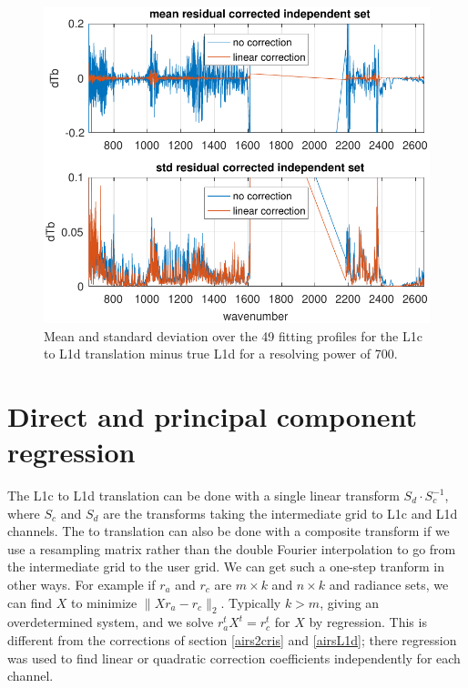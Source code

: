 \documentclass[10pt,twocolumn]{article}
\begin{document}
\begin{figure} %
  \centering
  \includegraphics[width=\linewidth]{figures/L1d_cor1_700.pdf}
  \caption{Mean and standard deviation over the 49 fitting profiles
    for the L1c to L1d translation minus true L1d for a resolving
    power of 700.}
  \label{L1d700s}
\end{figure}

\section{Direct and principal component regression}
\label{dregr}

The {\airs} L1c to L1d translation can be done with a single linear
transform $S_d\cdot S_c^{-1}$, where $S_c$ and $S_d$ are the
transforms taking the intermediate grid to L1c and L1d channels.
The {\airs} to {\cris} translation can also be done with a composite
transform if we use a resampling matrix rather than the double
Fourier interpolation to go from the intermediate grid to the {\cris}
user grid.  We can get such a one-step tranform in other ways.  For
example if $r_a$ and $r_c$ are $m \times k$ and $n \times k$ {\airs}
and {\cris} radiance sets, we can find $X$ to minimize $\|X r_a -
r_c\|_2$.  Typically $k > m$, giving an overdetermined system, and
we solve $r_a^t X^t = r_c^t$ for $X$ by regression.  This is
different from the corrections of section \ref{airs2cris} and
\ref{airsL1d}; there regression was used to find linear or quadratic
correction coefficients independently for each channel.
\end{document}
